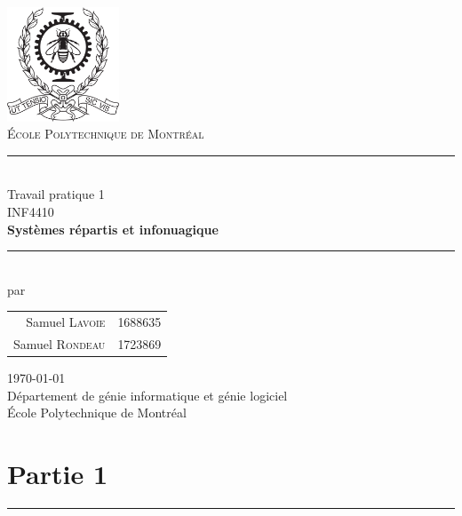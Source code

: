 \documentclass[12pt,letterpaper]{article}
\begin{document}
\begin{titlepage}
\begin{center}

\includegraphics[width=0.25\textwidth]{../poly.png}~\\[1cm]

\textsc{\huge École Polytechnique de Montréal}\\[1cm]

\rule{0.5\linewidth}{0.5mm} \\[0.4cm]
{\LARGE Travail pratique 1}\\[0.6cm]

{\large INF4410}\\[0.2cm]
{\large \textbf{Systèmes répartis et infonuagique}}\\[0.4cm]

\rule{0.5\linewidth}{0.5mm} \\[1cm]

{\large par}\\[0.6cm]
\begin{Large}
  \begin{tabular}{r l}
    Samuel \textsc{Lavoie} & 1688635\\[0.4cm]
    Samuel \textsc{Rondeau} & 1723869\\[0.4cm]
  \end{tabular}
\end{Large}

\vfill

{\large \today}\\[0.5cm]
{\large Département de génie informatique et génie logiciel}\\[0.2cm]
{\large École Polytechnique de Montréal}

\end{center}
\end{titlepage}


\section*{Partie 1}
\hrule
\vspace{1em}
\end{document}
